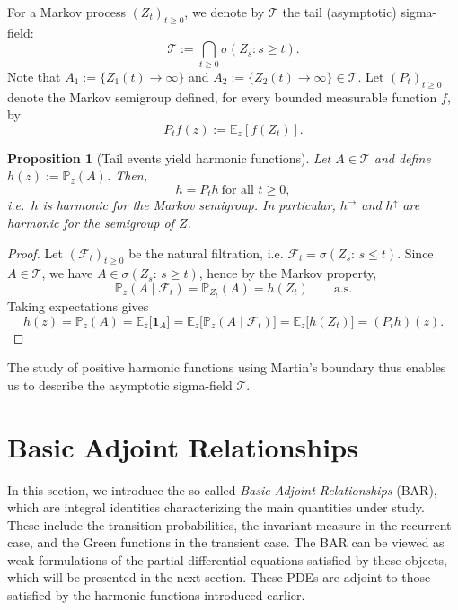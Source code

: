 \documentclass[11pt]{article}
\newtheorem{prop}[thm]{Proposition}
\theoremstyle{definition}
\begin{document}
For a Markov process $(Z_t)_{t\ge 0}$, we denote by $\mathcal{T}$ the tail (asymptotic) sigma-field:
   $$\mathcal{T} := \bigcap_{t\ge 0} \sigma(Z_s : s\ge t).$$
Note that $A_1:=\{Z_1(t)\to\infty\}$ and $A_2:=\{Z_2(t)\to\infty\}\in \mathcal{T} $.
Let $(P_t)_{t\ge0}$ denote the Markov semigroup defined, for every bounded measurable function $f$, by
\[
P_t f(z):=\mathbb{E}_z[f(Z_t)].
\]
\begin{prop}[Tail events yield harmonic functions]
Let $A\in\mathcal{T}$ and define $h(z):=\mathbb{P}_z(A)$. Then, \[
{\quad h = P_t h \ \text{for all } t\ge 0, \quad}
\]
i.e.\ $h$ is harmonic for the Markov semigroup. In particular, $h^\rightarrow$ and $h^\uparrow$ are harmonic for the semigroup of $Z$.
\end{prop}
\begin{proof}
Let $(\mathcal{F}_t)_{t\ge 0}$ be the natural filtration, i.e. $\mathcal{F}_t=\sigma(Z_s:\, s\le t)$.
Since $A\in\mathcal{T}$, we have $A\in \sigma(Z_s:\, s\ge t)$, hence by the Markov property,
\[
\mathbb{P}_z(A\mid \mathcal{F}_t)=\mathbb{P}_{Z_t}(A)=h(Z_t)\qquad\text{a.s.}
\]
Taking expectations gives
\[
h(z)=\mathbb{P}_z(A)=\mathbb{E}_z\!\big[\mathbf{1}_A\big]
=\mathbb{E}_z\!\Big[\mathbb{P}_z(A\mid \mathcal{F}_t)\Big]
=\mathbb{E}_z\!\big[h(Z_t)\big]
= (P_t h)(z).
\]
\end{proof}
The study of positive harmonic functions using Martin’s boundary thus enables us to describe the asymptotic sigma-field $\mathcal{T}$.
 

\section{Basic Adjoint Relationships}
\label{sec:BAR}

In this section, we introduce the so-called \emph{Basic Adjoint Relationships} (BAR), which are integral identities characterizing the main quantities under study. These include the transition probabilities, the invariant measure in the recurrent case, and the Green functions in the transient case. The BAR can be viewed as weak formulations of the partial differential equations satisfied by these objects, which will be presented in the next section. These PDEs are adjoint to those satisfied by the harmonic functions introduced earlier.
\end{document}

